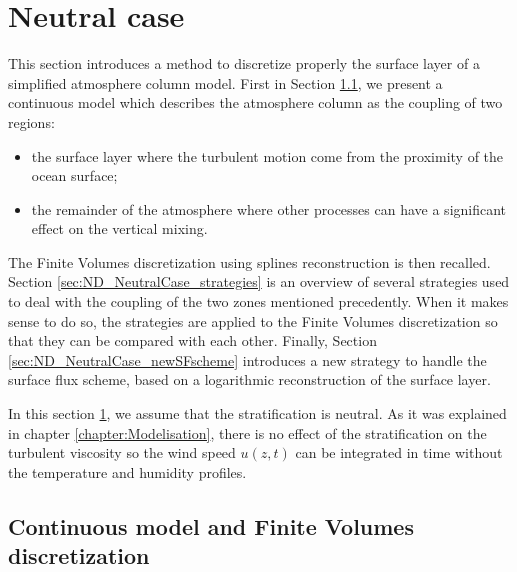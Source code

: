 \section{Neutral case}
\label{sec:ND_NeutralCase}
This section introduces a method to discretize properly
the surface layer of a simplified atmosphere column model.
First in Section \ref{sec:ND_NeutralCase_continuousModel},
we present a continuous model which describes the atmosphere
column as the coupling of two regions:
\begin{itemize}
		\item the surface layer where the turbulent motion
			come from the proximity of the ocean surface;
		\item the remainder of the atmosphere where other
			processes can have a significant effect
			on the vertical mixing.
\end{itemize}
The Finite Volumes discretization using splines reconstruction
is then recalled.
Section \ref{sec:ND_NeutralCase_strategies}
is an overview of several strategies used to deal
with the coupling of the two zones mentioned precedently.
When it makes sense to do so, the strategies are applied to the
Finite Volumes discretization so that they can be
compared with each other.
Finally, Section \ref{sec:ND_NeutralCase_newSFscheme}
introduces a new strategy to handle the surface flux scheme,
based on a logarithmic reconstruction of the surface layer.

In this section \ref{sec:ND_NeutralCase},
we assume that the stratification is neutral.
As it was explained in chapter \ref{chapter:Modelisation},
there is no effect of the stratification on the turbulent viscosity
so the wind speed $u(z, t)$ can be integrated in time
without the temperature and humidity profiles.
\subsection{Continuous model and Finite Volumes discretization}
\label{sec:ND_NeutralCase_continuousModel}
